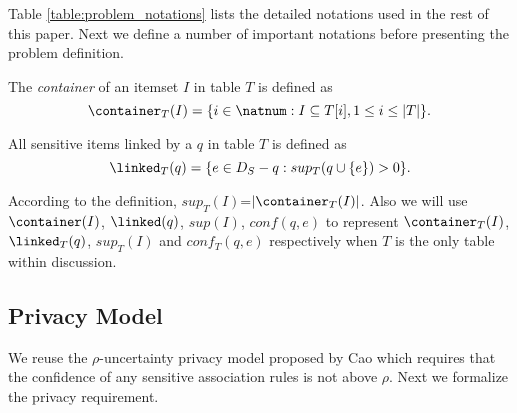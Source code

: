 Table \ref{table:problem_notations} lists the detailed notations used in the
rest of this paper. Next we define a number of important notations before
presenting the problem definition.

\begin{definition}[Container]
The \emph{container} of an itemset $I$ in table $T$ is defined as \[
\container_T(I) = \{ i \in \natnum : I \subseteq T[i], 1 \leq i \leq |T| \}
.\]
\end{definition}

\begin{definition}
All sensitive items linked by a \qid $q$ in table $T$ is defined as \[
\linked_T(q) = \{ e \in D_S-q : sup_{T}(q\cup\{e\}) > 0 \} .\]
\end{definition}
 According to the definition, $sup_{T}(I)$=$|\container_T(I)|$.
 Also we will use $\container(I)$, $\linked(q)$, $sup(I)$,
$conf(q,e)$ to represent $\container_T(I)$, $\linked_T(q)$, $sup_{T}(I)$ and
$conf_{T}(q,e)$ respectively when $T$ is the only table within discussion.

\subsection{Privacy Model}
We reuse the $\rho$-uncertainty privacy model
proposed by Cao \etal \cite{Cao:2010:rho} which requires that the confidence of any sensitive
association rules is not above $\rho$. Next we formalize the
privacy requirement.


